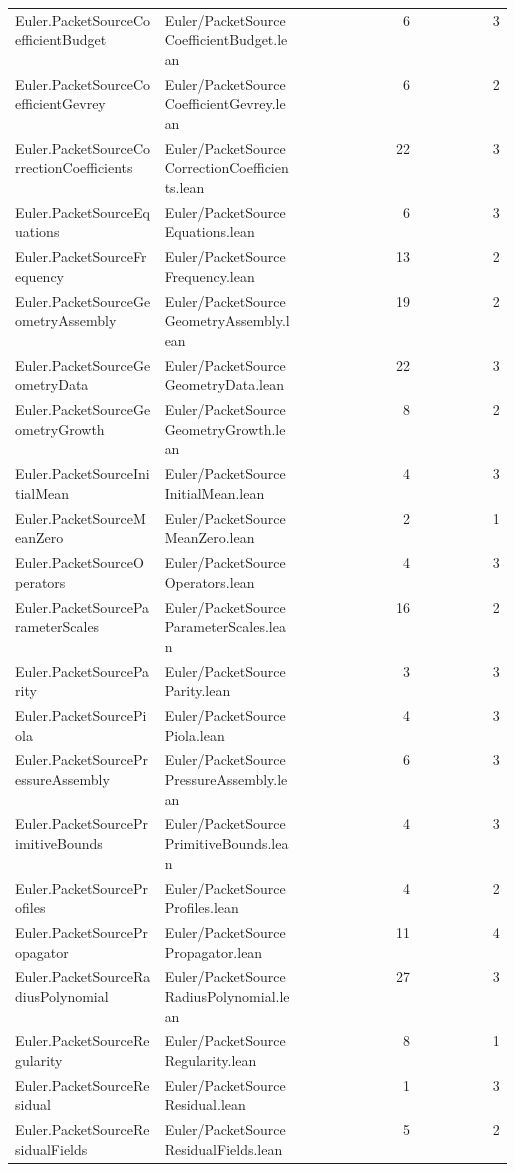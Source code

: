 \begin{longtable}{p{0.30\linewidth}p{0.28\linewidth}rr}
Euler.PacketSourceCoefficientBudget & Euler/PacketSourceCoefficientBudget.lean & 6 & 3\\
Euler.PacketSourceCoefficientGevrey & Euler/PacketSourceCoefficientGevrey.lean & 6 & 2\\
Euler.PacketSourceCorrectionCoefficients & Euler/PacketSourceCorrectionCoefficients.lean & 22 & 3\\
Euler.PacketSourceEquations & Euler/PacketSourceEquations.lean & 6 & 3\\
Euler.PacketSourceFrequency & Euler/PacketSourceFrequency.lean & 13 & 2\\
Euler.PacketSourceGeometryAssembly & Euler/PacketSourceGeometryAssembly.lean & 19 & 2\\
Euler.PacketSourceGeometryData & Euler/PacketSourceGeometryData.lean & 22 & 3\\
Euler.PacketSourceGeometryGrowth & Euler/PacketSourceGeometryGrowth.lean & 8 & 2\\
Euler.PacketSourceInitialMean & Euler/PacketSourceInitialMean.lean & 4 & 3\\
Euler.PacketSourceMeanZero & Euler/PacketSourceMeanZero.lean & 2 & 1\\
Euler.PacketSourceOperators & Euler/PacketSourceOperators.lean & 4 & 3\\
Euler.PacketSourceParameterScales & Euler/PacketSourceParameterScales.lean & 16 & 2\\
Euler.PacketSourceParity & Euler/PacketSourceParity.lean & 3 & 3\\
Euler.PacketSourcePiola & Euler/PacketSourcePiola.lean & 4 & 3\\
Euler.PacketSourcePressureAssembly & Euler/PacketSourcePressureAssembly.lean & 6 & 3\\
Euler.PacketSourcePrimitiveBounds & Euler/PacketSourcePrimitiveBounds.lean & 4 & 3\\
Euler.PacketSourceProfiles & Euler/PacketSourceProfiles.lean & 4 & 2\\
Euler.PacketSourcePropagator & Euler/PacketSourcePropagator.lean & 11 & 4\\
Euler.PacketSourceRadiusPolynomial & Euler/PacketSourceRadiusPolynomial.lean & 27 & 3\\
Euler.PacketSourceRegularity & Euler/PacketSourceRegularity.lean & 8 & 1\\
Euler.PacketSourceResidual & Euler/PacketSourceResidual.lean & 1 & 3\\
Euler.PacketSourceResidualFields & Euler/PacketSourceResidualFields.lean & 5 & 2\\

\end{longtable}

